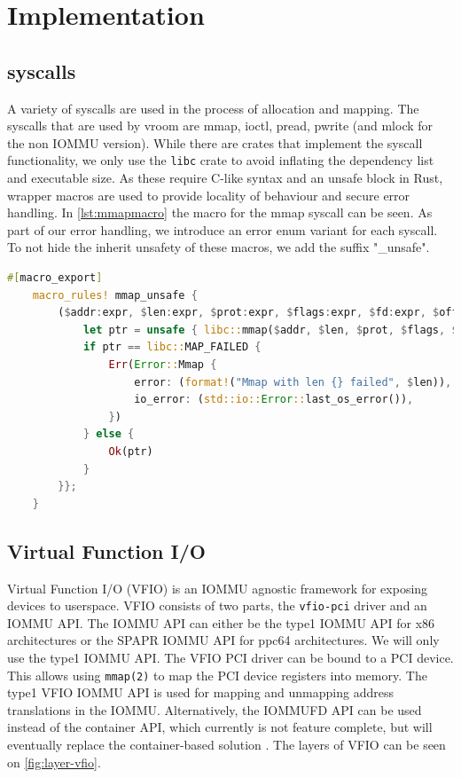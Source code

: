 \chapter{Implementation} \label{c:impl}

\section{syscalls}
A variety of syscalls are used in the process of allocation and mapping. The syscalls that are used by vroom are mmap, ioctl, pread, pwrite (and mlock for the non IOMMU version). While there are crates that implement the syscall functionality, we only use the \texttt{libc} crate to avoid inflating the dependency list and executable size. As these require C-like syntax and an unsafe block in Rust, wrapper macros are used to provide locality of behaviour and secure error handling. In \autoref{lst:mmapmacro} the macro for the mmap syscall can be seen.
As part of our error handling, we introduce an error enum variant for each syscall. To not hide the inherit unsafety of these macros, we add the suffix "\_unsafe".

\begin{lstlisting}[language=Rust,caption={Syscall \texttt{mmap} macro, with own error variant}, label=lst:mmapmacro]
    #[macro_export]
    macro_rules! mmap_unsafe {
        ($addr:expr, $len:expr, $prot:expr, $flags:expr, $fd:expr, $offset:expr) => {{
            let ptr = unsafe { libc::mmap($addr, $len, $prot, $flags, $fd, $offset) };
            if ptr == libc::MAP_FAILED {
                Err(Error::Mmap {
                    error: (format!("Mmap with len {} failed", $len)),
                    io_error: (std::io::Error::last_os_error()),
                })
            } else {
                Ok(ptr)
            }
        }};
    } 
\end{lstlisting}

\section{Virtual Function I/O}
Virtual Function I/O (VFIO) is an IOMMU agnostic framework for exposing devices to userspace. VFIO consists of two parts, the \texttt{vfio-pci} driver and an IOMMU API. The IOMMU API can either be the type1 IOMMU API for x86 architectures or the SPAPR IOMMU API for ppc64 architectures. We will only use the type1 IOMMU API. The VFIO PCI driver can be bound to a PCI device. This allows using \texttt{mmap(2)} to map the PCI device registers into memory. The type1 VFIO IOMMU API is used for mapping and unmapping address translations in the IOMMU. Alternatively, the IOMMUFD API can be used instead of the container API, which currently is not feature complete, but will eventually replace the container-based solution \cite{vfiokerneldocs}. The layers of VFIO can be seen on \autoref{fig:layer-vfio}.

